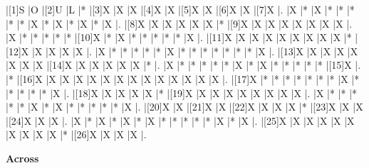 \documentclass{article}
\begin{document}
\begin{Puzzle}{15}{15}
	|[1]S   |O      |[2]U   |L  |*      |[3]X  |X      |X     |[4]X   |X      |[5]X   |X      |[6]X   |X  |[7]X   |.
	|X      |*      |X      |*  |*      |*     |*      |*     |X      |*      |X      |*      |X      |*  |X      |.
	|[8]X   |X      |X      |X  |X      |X     |*      |[9]X  |X      |X      |X      |X      |X      |X  |X      |.
	|X      |*      |*      |*  |*      |*     |[10]X  |*     |X      |*      |*      |*      |*      |*  |X      |.
	|[11]X  |X      |X      |X  |X      |X     |X      |X     |X      |*      |[12]X  |X      |X      |X  |X      |.
	|X      |*      |*      |*  |*      |*     |X      |*     |*      |*      |*      |*      |*      |*  |X      |.
	|[13]X  |X      |X      |X  |X      |X     |X      |X     |[14]X  |X      |X      |X      |X      |X  |*      |.
	|X      |*      |*      |*  |*      |*     |X      |*     |X      |*      |*      |*      |*      |*  |[15]X  |.
	|*      |[16]X  |X      |X  |X      |X     |X      |X     |X      |X      |X      |X      |X      |X  |X      |.
	|[17]X  |*      |*      |*  |*      |*     |*      |*     |X      |*      |*      |*      |*      |*  |X      |.
	|[18]X  |X      |X      |X  |X      |*     |[19]X  |X     |X      |X      |X      |X      |X      |X  |X      |.
	|X      |*      |*      |*  |*      |*     |X      |*     |X      |*      |*      |*      |*      |*  |X      |.
	|[20]X  |X      |[21]X  |X  |[22]X  |X     |X      |X     |*      |[23]X  |X      |X      |[24]X  |X  |X      |.
	|X      |*      |X      |*  |X      |*     |X      |*     |*      |*      |*      |*      |X      |*  |X      |.
	|[25]X  |X      |X      |X  |X      |X     |X      |X     |X      |X      |*      |[26]X  |X      |X  |X      |.
\end{Puzzle}

\begin{PuzzleClues}{\textbf{Across}}
\end{PuzzleClues}
\end{document}
